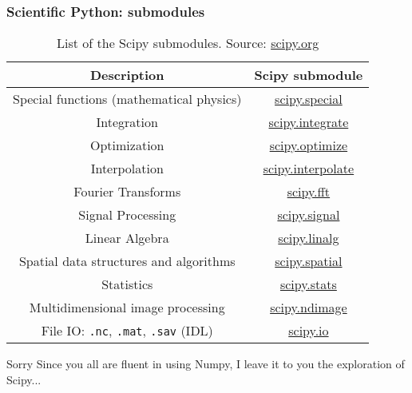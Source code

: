 \begin{frame}[fragile]
    \frametitle{Scientific Python: submodules}


    \begin{table}
        \centering
        \footnotesize
        \begin{tabular}{cc} 
            Description & Scipy submodule \\
            \hline
            \hline
            Special functions (mathematical physics) & \href{https://docs.scipy.org/doc/scipy/reference/tutorial/special.html}{scipy.special}\\
            Integration &\href{https://docs.scipy.org/doc/scipy/reference/tutorial/integrate.html}{scipy.integrate}\\
            Optimization &\href{https://docs.scipy.org/doc/scipy/reference/tutorial/optimize.html}{scipy.optimize}\\
            Interpolation &\href{https://docs.scipy.org/doc/scipy/reference/tutorial/optimize.html}{scipy.interpolate}\\
            Fourier Transforms &\href{https://docs.scipy.org/doc/scipy/reference/tutorial/fft.html}{scipy.fft}\\
            Signal Processing &\href{https://docs.scipy.org/doc/scipy/reference/tutorial/signal.html}{scipy.signal}\\
            Linear Algebra &\href{https://docs.scipy.org/doc/scipy/reference/tutorial/linalg.html}{scipy.linalg}\\
            Spatial data structures and algorithms & \href{https://docs.scipy.org/doc/scipy/reference/tutorial/spatial.html}{scipy.spatial}\\
            Statistics & \href{https://docs.scipy.org/doc/scipy/reference/tutorial/stats.html}{scipy.stats}\\
            Multidimensional image processing & \href{https://docs.scipy.org/doc/scipy/reference/tutorial/ndimage.html}{scipy.ndimage}\\
            File IO: \verb+.nc+, \verb+.mat+, \verb+.sav+ (IDL) &  \href{https://docs.scipy.org/doc/scipy/reference/tutorial/io.html}{scipy.io}\\
        \end{tabular}
        \caption{List of the Scipy submodules. Source: \href{https://www.scipy.org/}{scipy.org}}
    \end{table}

    \begin{block}{Sorry}
        Since you all are fluent in using Numpy, I leave it to you the exploration of Scipy...
    \end{block}

\end{frame}


